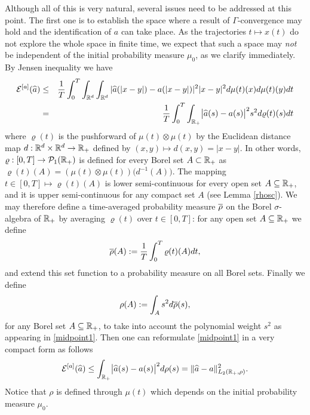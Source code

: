 Although all of this is very natural, several issues  need to be addressed at this point.
The first one is to establish the space where a result of $\Gamma$-convergence may hold and the identification of $a$ can take place.
As the trajectories $t\mapsto x(t)$ do not explore the whole  space in finite time, we expect that such a space may {\it not} be independent of the initial probability measure $\mu_0$, as we clarify immediately.
By Jensen inequality we have
\begin{eqnarray}
\mathcal E^{[a]}(\widehat a)  &\leq & \frac{1}{T}\int_0^T  \int_{\mathbb{R}^d} \int_{\mathbb{R}^d}  | \widehat a(| x-y|) - a(| x-y|)|^2 | x-y|^2d \mu(t)(x) d \mu(t)(y) dt  \label{est-functional-1}\\
&= & \frac{1}{T}  \int_0^T\int_{\mathbb{R}_+}\bigl|\widehat a(s)-a(s)\bigr|^2 s^2d\varrho(t)(s) dt \label{midpoint1}
\end{eqnarray}
where $\varrho(t)$ is the pushforward of $\mu(t)\otimes\mu(t)$ by the Euclidean distance map
	$d:\mathbb{R}^d\times\mathbb{R}^d\rightarrow\mathbb{R}_+$ %
 	defined by $(x,y)\mapsto d(x,y)=|x-y|$. %
In other words, $\varrho:[0,T]\rightarrow \mathcal{P}_1(\mathbb{R}_+)$ is defined for every Borel set $A\subset\mathbb{R}_+$ as $\varrho(t)(A)=(\mu(t)\otimes\mu(t))\bigl(d^{-1}(A)\bigr)$.
The mapping $t \in [0,T] \mapsto\varrho(t)(A)$ is lower semi-continuous for every open set $A\subseteq\mathbb{R}_+$, and it is upper semi-continuous  for any compact set $A$ (see Lemma \ref{rhosc}).
We may therefore define a time-averaged probability measure $\overline\rho$ on the Borel $\sigma$-algebra of $\mathbb{R}_+$ by averaging $\varrho(t)$ over $t \in [0,T]$: for any open set $A \subseteq \mathbb{R}_+$ we define
\begin{align}\label{finallyrho}%
	\prerho(A):=\frac{1}{T}\int_0^T\varrho(t)(A)dt,
\end{align}
and extend this set function to a probability measure on all Borel sets. Finally we define
\begin{equation}
 \rho(A):=\int_A s^2 d\overline\rho(s),
 \label{rho}
\end{equation}
for any Borel set  $A\subseteq\mathbb{R}_+$, to take into account the polynomial weight $s^2$ as appearing in \eqref{midpoint1}.
Then one can reformulate \eqref{midpoint1} in a very compact form as follows
\begin{align}\label{midpoint2}
	\mathcal E^{[a]}(\widehat a)\leq \int_{\mathbb{R}_+}\bigl|\widehat a(s)-a(s)\bigr|^2 d \rho(s)
		=\| \widehat a - a \|^2_{L_2(\mathbb R_+,\rho)}.
\end{align}
Notice that $\rho$ is defined through $\mu(t)$ which depends on the initial probability measure $\mu_0$. 

